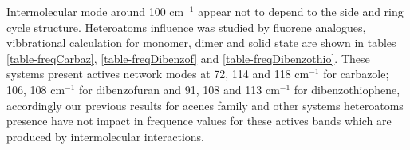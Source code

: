  	Intermolecular mode around 100 cm$^{-1}$ appear not to depend to the side and ring cycle structure. Heteroatoms influence was studied by fluorene analogues, vibbrational calculation for monomer, dimer and solid state are shown in tables \ref{table-freqCarbaz}, \ref{table-freqDibenzof} and \ref{table-freqDibenzothio}. These systems present actives network modes at 72, 114 and 118 cm$^{-1}$ for carbazole; 106, 108 cm$^{-1}$ for dibenzofuran and 91, 108 and 113 cm$^{-1}$ for dibenzothiophene, accordingly our previous results for acenes family and other systems heteroatoms presence have not impact in frequence values for these actives bands which are produced by intermolecular interactions. 
 	
  
 	
 
 
 	
 	
